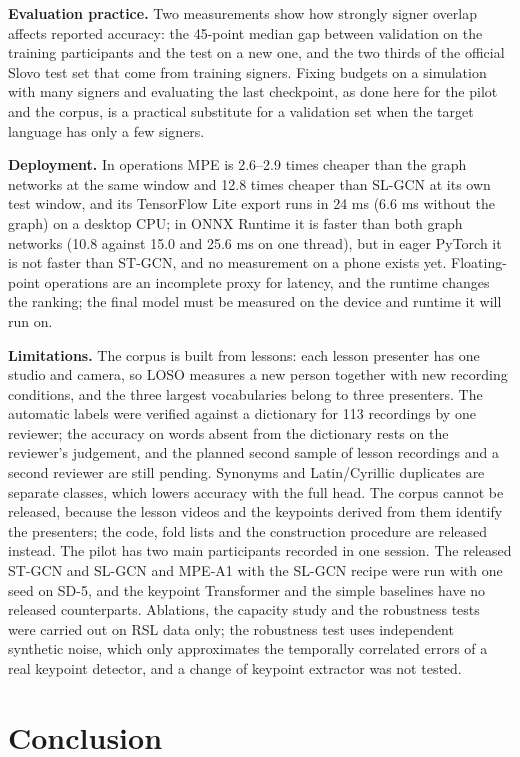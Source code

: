 \textbf{Evaluation practice.} Two measurements show how strongly signer overlap affects reported accuracy: the 45-point median gap between validation on the training participants and the test on a new one, and the two thirds of the official Slovo test set that come from training signers. Fixing budgets on a simulation with many signers and evaluating the last checkpoint, as done here for the pilot and the corpus, is a practical substitute for a validation set when the target language has only a few signers.

\textbf{Deployment.} In operations MPE is 2.6--2.9 times cheaper than the graph networks at the same window and 12.8 times cheaper than SL-GCN at its own test window, and its TensorFlow Lite export runs in 24 ms (6.6 ms without the graph) on a desktop CPU; in ONNX Runtime it is faster than both graph networks (10.8 against 15.0 and 25.6 ms on one thread), but in eager PyTorch it is not faster than ST-GCN, and no measurement on a phone exists yet. Floating-point operations are an incomplete proxy for latency, and the runtime changes the ranking; the final model must be measured on the device and runtime it will run on.

\textbf{Limitations.} The corpus is built from lessons: each lesson presenter has one studio and camera, so LOSO measures a new person together with new recording conditions, and the three largest vocabularies belong to three presenters. The automatic labels were verified against a dictionary for 113 recordings by one reviewer; the accuracy on words absent from the dictionary rests on the reviewer's judgement, and the planned second sample of lesson recordings and a second reviewer are still pending. Synonyms and Latin/Cyrillic duplicates are separate classes, which lowers accuracy with the full head. The corpus cannot be released, because the lesson videos and the keypoints derived from them identify the presenters; the code, fold lists and the construction procedure are released instead. The pilot has two main participants recorded in one session. The released ST-GCN and SL-GCN and MPE-A1 with the SL-GCN recipe were run with one seed on SD-5, and the keypoint Transformer and the simple baselines have no released counterparts. Ablations, the capacity study and the robustness tests were carried out on RSL data only; the robustness test uses independent synthetic noise, which only approximates the temporally correlated errors of a real keypoint detector, and a change of keypoint extractor was not tested.

\hypertarget{conclusion}{%
\section{Conclusion}\label{conclusion}}

